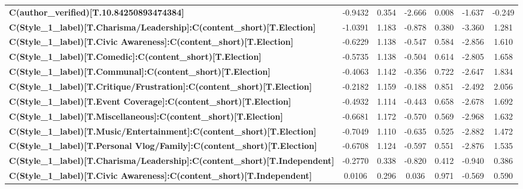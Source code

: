 \begin{center}
\begin{tabular}{lcccccc}
\textbf{C(author\_verified)[T.10.84250893474384]}                                    &      -0.9432  &        0.354     &    -2.666  &         0.008        &       -1.637    &       -0.249     \\
\textbf{C(Style\_1\_label)[T.Charisma/Leadership]:C(content\_short)[T.Election]}     &      -1.0391  &        1.183     &    -0.878  &         0.380        &       -3.360    &        1.281     \\
\textbf{C(Style\_1\_label)[T.Civic Awareness]:C(content\_short)[T.Election]}         &      -0.6229  &        1.138     &    -0.547  &         0.584        &       -2.856    &        1.610     \\
\textbf{C(Style\_1\_label)[T.Comedic]:C(content\_short)[T.Election]}                 &      -0.5735  &        1.138     &    -0.504  &         0.614        &       -2.805    &        1.658     \\
\textbf{C(Style\_1\_label)[T.Communal]:C(content\_short)[T.Election]}                &      -0.4063  &        1.142     &    -0.356  &         0.722        &       -2.647    &        1.834     \\
\textbf{C(Style\_1\_label)[T.Critique/Frustration]:C(content\_short)[T.Election]}    &      -0.2182  &        1.159     &    -0.188  &         0.851        &       -2.492    &        2.056     \\
\textbf{C(Style\_1\_label)[T.Event Coverage]:C(content\_short)[T.Election]}          &      -0.4932  &        1.114     &    -0.443  &         0.658        &       -2.678    &        1.692     \\
\textbf{C(Style\_1\_label)[T.Miscellaneous]:C(content\_short)[T.Election]}           &      -0.6681  &        1.172     &    -0.570  &         0.569        &       -2.968    &        1.632     \\
\textbf{C(Style\_1\_label)[T.Music/Entertainment]:C(content\_short)[T.Election]}     &      -0.7049  &        1.110     &    -0.635  &         0.525        &       -2.882    &        1.472     \\
\textbf{C(Style\_1\_label)[T.Personal Vlog/Family]:C(content\_short)[T.Election]}    &      -0.6708  &        1.124     &    -0.597  &         0.551        &       -2.876    &        1.535     \\
\textbf{C(Style\_1\_label)[T.Charisma/Leadership]:C(content\_short)[T.Independent]}  &      -0.2770  &        0.338     &    -0.820  &         0.412        &       -0.940    &        0.386     \\
\textbf{C(Style\_1\_label)[T.Civic Awareness]:C(content\_short)[T.Independent]}      &       0.0106  &        0.296     &     0.036  &         0.971        &       -0.569    &        0.590     \\

\end{tabular}
\end{center}
